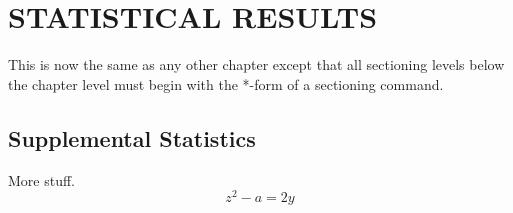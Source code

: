 \chapter{STATISTICAL RESULTS}

This is now the same as any other chapter except that
all sectioning levels below the chapter level must begin
with the *-form of a sectioning command.

\section*{Supplemental Statistics}

More stuff.
\begin{equation}
    z^2-a=2y
\end{equation}